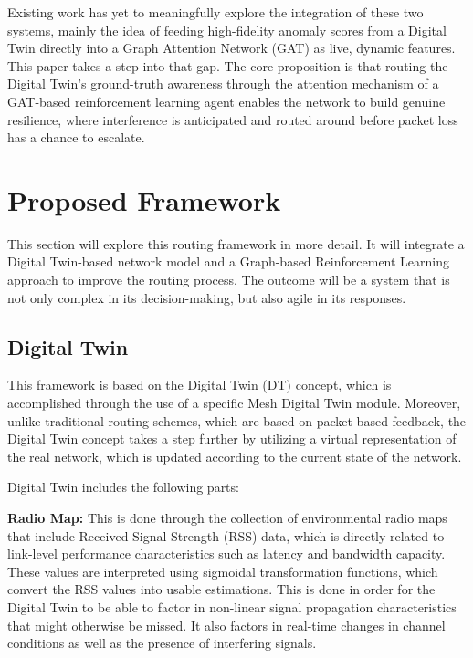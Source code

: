 \documentclass[conference]{IEEEtran}
\begin{document}
Existing work has yet to meaningfully explore the integration of these two systems, mainly the idea of feeding high-fidelity anomaly scores from a Digital Twin directly into a Graph Attention Network (GAT) as live, dynamic features. This paper takes a step into that gap. The core proposition is that routing the Digital Twin's ground-truth awareness through the attention mechanism of a GAT-based reinforcement learning agent enables the network to build genuine resilience, where interference is anticipated and routed around before packet loss has a chance to escalate.

\section{Proposed Framework}

This section will explore this routing framework in more detail. It will integrate a Digital Twin-based network model and a Graph-based Reinforcement Learning approach to improve the routing process. The outcome will be a system that is not only complex in its decision-making, but also agile in its responses.

\subsection{Digital Twin}

This framework is based on the Digital Twin (DT) concept, which is accomplished through the use of a specific Mesh Digital Twin module. Moreover, unlike traditional routing schemes, which are based on packet-based feedback, the Digital Twin concept takes a step further by utilizing a virtual representation of the real network, which is updated according to the current state of the network.

Digital Twin includes the following parts:

\textbf{Radio Map:} This is done through the collection of environmental radio maps that include Received Signal Strength (RSS) data, which is directly related to link-level performance characteristics such as latency and bandwidth capacity. These values are interpreted using sigmoidal transformation functions, which convert the RSS values into usable estimations. This is done in order for the Digital Twin to be able to factor in non-linear signal propagation characteristics that might otherwise be missed. It also factors in real-time changes in channel conditions as well as the presence of interfering signals.
\end{document}
